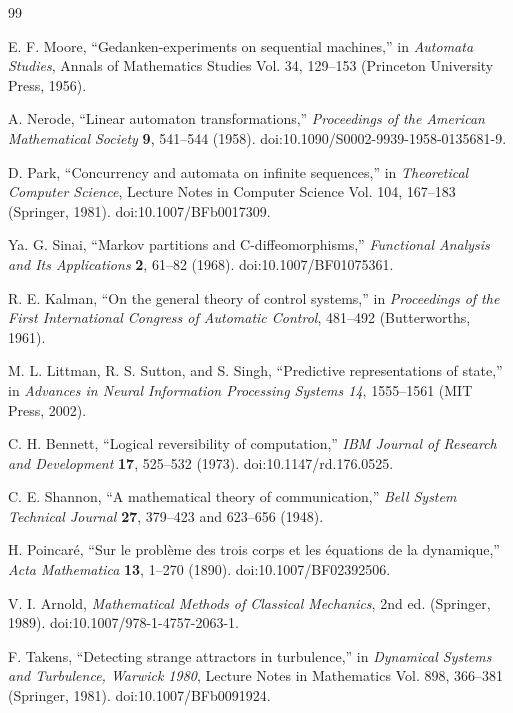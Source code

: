 \documentclass[11pt]{article}
\begin{document}
\begin{thebibliography}{99}
\setlength{\itemsep}{2pt}

E. F. Moore,
``Gedanken-experiments on sequential machines,'' in
\emph{Automata Studies}, Annals of Mathematics Studies Vol. 34,
129--153 (Princeton University Press, 1956).

A. Nerode,
``Linear automaton transformations,''
\emph{Proceedings of the American Mathematical Society} \textbf{9}, 541--544
(1958).
doi:10.1090/S0002-9939-1958-0135681-9.

D. Park,
``Concurrency and automata on infinite sequences,'' in
\emph{Theoretical Computer Science}, Lecture Notes in Computer Science Vol. 104,
167--183 (Springer, 1981).
doi:10.1007/BFb0017309.

Ya. G. Sinai,
``Markov partitions and C-diffeomorphisms,''
\emph{Functional Analysis and Its Applications} \textbf{2}, 61--82 (1968).
doi:10.1007/BF01075361.

R. E. Kalman,
``On the general theory of control systems,'' in
\emph{Proceedings of the First International Congress of Automatic Control},
481--492 (Butterworths, 1961).

M. L. Littman, R. S. Sutton, and S. Singh,
``Predictive representations of state,'' in
\emph{Advances in Neural Information Processing Systems 14}, 1555--1561
(MIT Press, 2002).

C. H. Bennett,
``Logical reversibility of computation,''
\emph{IBM Journal of Research and Development} \textbf{17}, 525--532 (1973).
doi:10.1147/rd.176.0525.

C. E. Shannon,
``A mathematical theory of communication,''
\emph{Bell System Technical Journal} \textbf{27}, 379--423 and 623--656 (1948).

H. Poincar\'e,
``Sur le probl\`eme des trois corps et les \'equations de la dynamique,''
\emph{Acta Mathematica} \textbf{13}, 1--270 (1890).
doi:10.1007/BF02392506.

V. I. Arnold,
\emph{Mathematical Methods of Classical Mechanics}, 2nd ed.
(Springer, 1989).
doi:10.1007/978-1-4757-2063-1.

F. Takens,
``Detecting strange attractors in turbulence,'' in
\emph{Dynamical Systems and Turbulence, Warwick 1980},
Lecture Notes in Mathematics Vol. 898, 366--381 (Springer, 1981).
doi:10.1007/BFb0091924.


\end{thebibliography}
\end{document}
